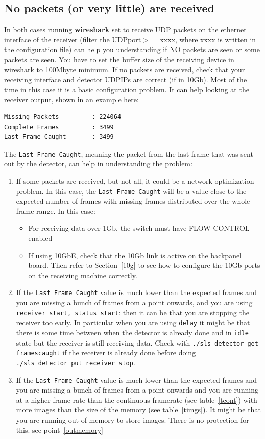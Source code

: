 \documentclass{article}
\begin{document}
\subsection{No packets (or very little) are received} 
In both cases running \textbf{wireshark} set to receive UDP packets on the ethernet interface of the receiver (filter the UDPport$>=$xxxx, where xxxx is written in the configuration file) can help you understanding if NO packets are seen or some packets are seen. You have to set the buffer size of the receiving device in wireshark to 100Mbyte minimum. If no packets are received, check that your receiving interface and detector UDPIPs are correct (if in 10Gb). Most of the time in this case it is a basic configuration problem.
It can help looking at the receiver output, shown in an example here:
\begin{verbatim}
Missing Packets         : 224064
Complete Frames         : 3499
Last Frame Caught       : 3499
\end{verbatim}

The {\tt{Last Frame Caught}}, meaning the packet from the last frame that was sent out by the detector, can help in understanding the problem: 
\begin{enumerate}
\item If some packets are received, but not all, it could be a network optimization problem. In this case, the {\tt{Last Frame Caught}} will be a value close to the expected number of frames with missing frames distributed over the whole frame range. In this case: 
 \begin{itemize}
\item For receiving data over 1Gb, the switch must have FLOW CONTROL enabled 
\item If using 10GbE, check that the 10Gb link is active on the backpanel board. Then refer to Section~\ref{10g} to see how to configure the 10Gb ports on the receiving machine correctly. 
\end{itemize}
\item If the {\tt{Last Frame Caught}} value is much lower than the expected frames and you are missing a bunch of frames from a point onwards, and you are using {\tt{receiver start, status start}}: then it can be that you are stopping the receiver too early. In particular when you are using {\tt{delay}} it might be that there is some time between when the detector is already done and in {\tt{idle}} state but the receiver is still receiving data. Check with {\tt{./sls\_detector\_get framescaught}} if the receiver is already done before doing {\tt{./sls\_detector\_put receiver stop}}.   
\item If the {\tt{Last Frame Caught}} value is much lower than the expected frames and you are missing a bunch of frames from a point onwards and you are running at a higher frame rate than the continuous framerate (see table~\ref{tcont}) with more images than the size of the memory (see table~\ref{timgs}). It might be that you are running out of memory to store images. There is no protection for this. see point~\ref{outmemory}
 \end{enumerate}
\end{document}
